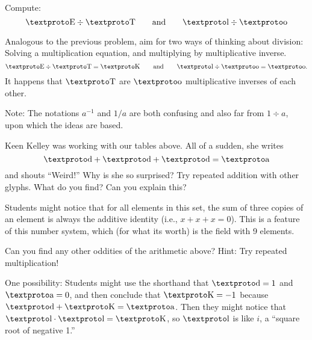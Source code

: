 \documentclass{ximera}
\begin{document}
\begin{problem} Compute:
\[
\lf \div \lc \qquad\text{and}\qquad \lh \div \li
\]
\begin{teachingnote}
Analogous to the previous problem, aim for two ways of thinking about division:  Solving a multiplication equation, and multiplying by multiplicative inverse. 
\[
\lf \div \lc = \ld \qquad\text{and}\qquad \lh \div \li = \li. \\
\]
It happens that $\lc$ are $\li$ multiplicative inverses of each other.  

Note:  The notations $a^{-1}$ and $1/a$ are both confusing and also far from $1\div a$, upon which the ideas are based.  
\end{teachingnote}
\end{problem}

\begin{problem} 
Keen Kelley was working with our tables above. All of a sudden, she
writes
\[
\loo + \loo + \loo = \lo
\]
and shouts ``Weird!'' Why is she so surprised? Try repeated addition
with other glyphs. What do you find? Can you explain this?
\begin{teachingnote}
Students might notice that for all elements in this set, the sum of three copies of an element is always the additive identity (i.e., $x + x + x = 0$).  This is a feature of this number system, which (for what its worth) is the field with 9 elements.  
\end{teachingnote}
\end{problem}


\begin{problem}
Can you find any other oddities of the arithmetic above? Hint: Try
repeated multiplication!
\begin{teachingnote}
One possibility: Students might use the shorthand that $\loo = 1$ and $\lo = 0$, and then conclude that $\ld = -1$ because $\loo+\ld=\lo$.  Then they might notice that $\lh\cdot \lh = \ld$, so $\lh$ is like $i$, a ``square root of negative 1.''
\end{teachingnote}
\end{problem}
\end{document}

